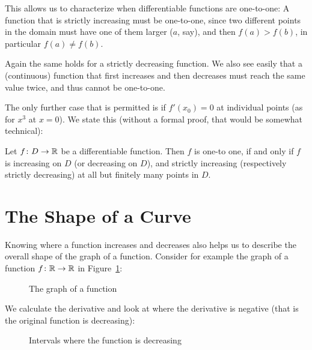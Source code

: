 This allows us to characterize when differentiable functions are one-to-one:
A function that is strictly increasing must be one-to-one, since two
different points in the domain must have one of them larger ($a$, say), and
then $f(a)>f(b)$, in particular $f(a)\not=f(b)$.

Again the same holds for a strictly decreasing function. We also see easily
that a (continuous) function that first increases and then decreases must
reach the same value twice, and thus cannot be one-to-one.

The only further
case that is permitted is if $f'(x_0)=0$ at individual points (as for $x^3$ at
$x=0$). We state this (without a formal proof, that would be somewhat
technical):
\begin{lemma}
Let $f\colon D\to{\mathbb R}$ be a differentiable function. Then $f$ is one-to one, if
and only if $f$ is increasing on $D$ (or decreasing on $D$), and strictly
increasing (respectively strictly decreasing) at all but finitely many
points in $D$.
\end{lemma}

\section{The Shape of a Curve}
\label{secshape}

Knowing where a function increases and decreases also helps us to describe
the overall shape of the graph of a function. Consider for example the
graph
of a function $f\colon{\mathbb R}\to{\mathbb R}$ in Figure~\ref{figkurvdiss1}:
\begin{figure}
\begin{center}
\end{center}
\caption{The graph of a function}
\label{figkurvdiss1}
\end{figure}

We calculate the derivative and look at where the derivative is negative
(that is the original function is decreasing):
\begin{figure}
\begin{center}
\end{center}
\caption{Intervals where the function is decreasing}
\label{figkurvdiss2}
\end{figure}

